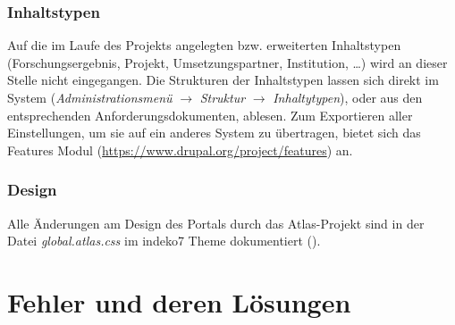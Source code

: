 \subsubsection{Inhaltstypen}\label{subsub:inhaltstypen}
Auf die im Laufe des Projekts angelegten bzw. erweiterten Inhaltstypen (Forschungsergebnis, Projekt, Umsetzungspartner, Institution, \dots) wird an dieser Stelle nicht eingegangen. Die Strukturen der Inhaltstypen lassen sich direkt im System (\textit{Administrationsmenü} $\rightarrow$ \textit{Struktur} $\rightarrow$  \textit{Inhaltytypen}), oder aus den entsprechenden Anforderungsdokumenten, ablesen. Zum Exportieren aller Einstellungen, um sie auf ein anderes System zu übertragen, bietet sich \zB das Features Modul (\url{https://www.drupal.org/project/features}) an.




\subsubsection{Design}\label{subsub:cssdesign}
Alle Änderungen am Design des Portals durch das Atlas-Projekt sind in der Datei \textit{global.atlas.css} im indeko7 Theme dokumentiert ().




\newpage
\section{Fehler und deren Lösungen}\label{sec:problems}

